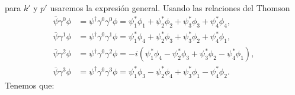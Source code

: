 para $k'$ y $p'$ usaremos la expresión general. Usando las relaciones del Thomson \cite{thomson_modern_physics}
\begin{align}
	\overline{\psi}\gamma^0\phi & = \psi^\dagger \gamma^0 \gamma^0 \phi
	= \psi_1^*\phi_1 + \psi_2^*\phi_2 + \psi_3^*\phi_3 + \psi_4^*\phi_4,     \\
	\overline{\psi}\gamma^1\phi & = \psi^\dagger \gamma^0 \gamma^1 \phi
	= \psi_1^*\phi_4 + \psi_2^*\phi_3 + \psi_3^*\phi_2 + \psi_4^*\phi_1,     \\
	\overline{\psi}\gamma^2\phi & = \psi^\dagger \gamma^0 \gamma^2 \phi
	= -i(\psi_1^*\phi_4 - \psi_2^*\phi_3 + \psi_3^*\phi_2 - \psi_4^*\phi_1), \\
	\overline{\psi}\gamma^3\phi & = \psi^\dagger \gamma^0 \gamma^3 \phi
	= \psi_1^*\phi_3 - \psi_2^*\phi_4 + \psi_3^*\phi_1 - \psi_4^*\phi_2.
\end{align}
Tenemos que:


